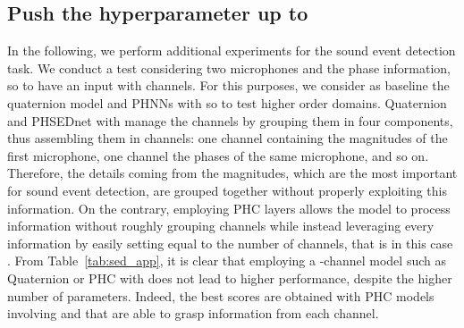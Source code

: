 \documentclass[lettersize,journal]{IEEEtran}
\begin{document}
\subsection{Push the hyperparameter  up to }
\label{ssubsec:sedresults}

In the following, we perform additional experiments for the sound event detection task. We conduct a test considering two microphones and the phase information, so to have an input with  channels. For this purposes, we consider as baseline the quaternion model and PHNNs with  so to test higher order domains. Quaternion and PHSEDnet with  manage the  channels by grouping them in four components, thus assembling them in  channels: one channel containing the magnitudes of the first microphone, one channel the phases of the same microphone, and so on. Therefore, the details coming from the magnitudes, which are the most important for sound event detection, are grouped together without properly exploiting this information. On the contrary, employing PHC layers allows the model to process information without roughly grouping channels while instead leveraging every information by easily setting  equal to the number of channels, that is in this case . From Table~\ref{tab:sed_app}, it is clear that employing a -channel model such as Quaternion or PHC with  does not lead to higher performance, despite the higher number of parameters. Indeed, the best scores are obtained with PHC models involving  and  that are able to grasp information from each channel.
\end{document}
